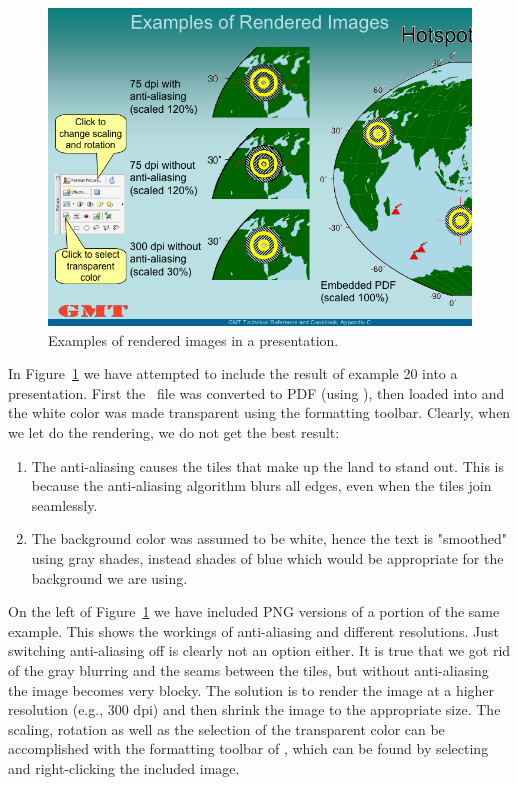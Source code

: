 \begin{figure}
   \includegraphics[width=\textwidth,bb=0 0 720 540]{ppt/rendering.png}
   \caption{Examples of rendered images in a \protect{} presentation.}
   \label{fig:rendering}
\end{figure}

In Figure~\ref{fig:rendering} we have attempted to include the result of example 20 into a  presentation. First the \PS\ file was converted to PDF (using ), then loaded into  and the white color was made transparent using the formatting toolbar. Clearly, when we let  do the rendering, we do not get the best result:\begin{enumerate}
\item The anti-aliasing causes the tiles that make up the land to stand out. This is because the anti-aliasing algorithm blurs all edges, even when the tiles join seamlessly.
\item The background color was assumed to be white, hence the text is "smoothed" using gray shades, instead shades of blue which would be appropriate for the background we are using.
\end{enumerate}

On the left of Figure~\ref{fig:rendering} we have included PNG versions of a portion of the same example. This shows the workings of anti-aliasing and different resolutions. Just switching anti-aliasing off is clearly not an option either. It is true that we got rid of the gray blurring and the seams between the tiles, but without anti-aliasing the image becomes very blocky. The solution is to render the image at a higher resolution (e.g., 300 dpi) and then shrink the image to the appropriate size. The scaling, rotation as well as the selection of the transparent color can be accomplished with the formatting toolbar of , which can be found by selecting and right-clicking the included image.


